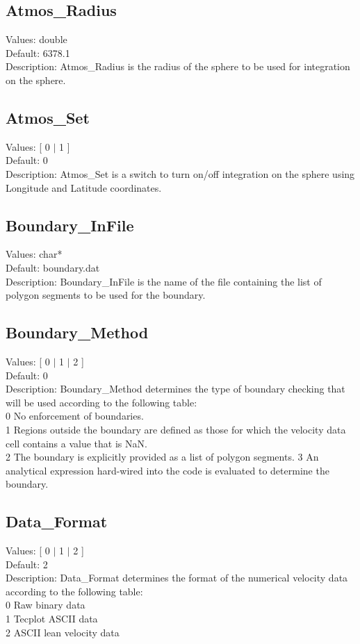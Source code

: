 \documentclass[11pt]{article}
\begin{document}
\subsection{Atmos\_Radius}
Values:   double \\
Default:  6378.1\\
Description:  Atmos\_Radius is the radius of the sphere to be used for integration on the sphere.

\subsection{Atmos\_Set}
Values:   [ 0 $|$ 1 ]  \\
Default:  0\\
Description:  Atmos\_Set is a switch to turn on/off integration on the sphere using Longitude and Latitude coordinates.

\subsection{Boundary\_InFile}
Values:   char* \\
Default:  boundary.dat\\
Description:  Boundary\_InFile is the name of the file containing the list of polygon segments to be used for the boundary.

\subsection{Boundary\_Method}
Values:   [ 0 $|$ 1 $|$ 2 ]  \\
Default:  0\\
Description:  Boundary\_Method determines the type of boundary checking that will be used according to the following table:\\
0	No enforcement of boundaries.\\
1	Regions outside the boundary are defined as those for which the velocity data cell contains a value that is NaN.\\
2	The boundary is explicitly provided as a list of polygon segments.
3	An analytical expression hard-wired into the code is evaluated to determine the boundary.

\subsection{Data\_Format}
Values:   [ 0 $|$ 1 $|$ 2 ]  \\
Default:  2\\
Description:  Data\_Format determines the format of the numerical velocity data according to the following table:\\
0	Raw binary data\\
1	Tecplot ASCII data\\
2	ASCII lean velocity data
\end{document}
